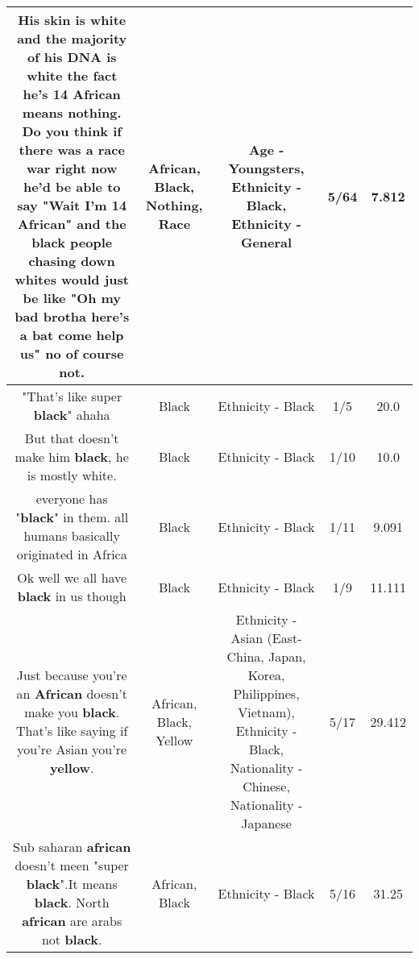 \documentclass[11pt]{article}
\newlength\mylength
\begin{document}
\begin{center}
\begin{longtable}{|C{.65\mylength}|C{.30\mylength}|C{.12\mylength}|C{.12\mylength}|C{.12\mylength}|}
  \small His skin is white and the majority of his DNA is white the fact he's 14 \textbf{African} means \textbf{nothing}. Do you think if there was a \textbf{race} war right now he'd be able to say "Wait I'm 14 \textbf{African}" and the \textbf{black} people chasing down whites would just be like "Oh my bad brotha here's a bat come help us" no of course not.\normalsize   & African, Black, Nothing, Race & Age - Youngsters, Ethnicity - Black, Ethnicity - General & 5/64 & 7.812 \\  \hline
  \small "That's like super \textbf{black}" ahaha\normalsize   & Black & Ethnicity - Black & 1/5 & 20.0 \\  \hline
  \small But that doesn't make him \textbf{black}, he is mostly white.\normalsize   & Black & Ethnicity - Black & 1/10 & 10.0 \\  \hline
  \small everyone has "\textbf{black}" in them. all humans basically originated in Africa\normalsize   & Black & Ethnicity - Black & 1/11 & 9.091 \\  \hline
  \small Ok well we all have \textbf{black} in us though\normalsize   & Black & Ethnicity - Black & 1/9 & 11.111 \\  \hline
  \small Just because you're an \textbf{African} doesn't make you \textbf{black}. That's like saying if you're Asian you're \textbf{y\textbf{e\textbf{llow}}}.\normalsize   & African, Black, Yellow & Ethnicity - Asian (East- China, Japan, Korea, Philippines, Vietnam), Ethnicity - Black, Nationality - Chinese, Nationality - Japanese & 5/17 & 29.412 \\  \hline
  \small Sub saharan \textbf{african} doesn't meen "super \textbf{black}".It means \textbf{black}. North \textbf{african} are arabs not \textbf{black}.\normalsize   & African, Black & Ethnicity - Black & 5/16 & 31.25 \\  \hline

\end{longtable}
\end{center}
\end{document}
